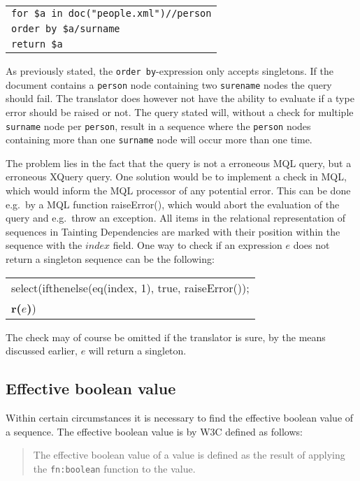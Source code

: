 \begin{center}
\begin{tabular}{l}
\texttt{for \$a in doc("people.xml")//person} \\
\texttt{order by \$a/surname} \\
\texttt{return \$a}
\end{tabular}
\end{center}

As previously stated, the \texttt{order by}-expression only accepts singletons. If the document contains a
\texttt{person} node containing two \texttt{surename} nodes the query should
fail. The translator does however not have the ability to evaluate if a type error should be raised or not. The query stated will, without a
check for multiple \texttt{surname} node per \texttt{person}, result in a sequence where the \texttt{person}
nodes containing more than one \texttt{surname} node will occur more than one time. 

The problem lies in the fact that the query is not a erroneous MQL query, but a erroneous XQuery query. One
solution would be to implement a check in MQL, which would inform the MQL processor of any potential error. This
can be done e.g.\ by a MQL function \textsf{raiseError()}, which would abort the evaluation of the query and e.g.\
throw an exception. All items in the relational representation of sequences in
Tainting Dependencies are marked with their position within the sequence with
the $index$ field. One way to check if an expression $e$ does not return a singleton sequence can be the following:
\begin{center}
\begin{tabular}{l}
\textsf{select(ifthenelse(eq(index, 1), true, raiseError());} \\ \quad
\textbf{r(}$e$\textbf{)}\textsf{)}
\end{tabular}
\end{center}

The check may of course be omitted if the translator is sure, by the means discussed earlier, $e$ will return a
singleton.

\subsection{Effective boolean value}
\label{sect:disc:effBool}
Within certain circumstances it is necessary to find the effective boolean value
of a sequence. The effective boolean value is by W3C defined as follows\cite{w3c00}: 
\begin{quote}
The effective boolean value of a value is defined as the result of applying the \texttt{fn:boolean} function to
the value.
\end{quote}

